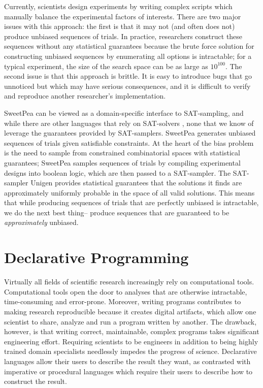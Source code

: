 Currently, scientists design experiments by writing complex scripts which manually balance the experimental factors of interests. There are two major issues with this approach: the first is that it may not (and often does not) produce unbiased sequences of trials. In practice, researchers construct these sequences without any statistical guarantees because the brute force solution for constructing unbiased sequences by enumerating all options is intractable; for a typical experiment, the size of the search space can be as large as $10^{100}$. The second issue is that this approach is brittle. It is easy to introduce bugs that go unnoticed but which may have serious consequences, and it is difficult to verify and reproduce another researcher's implementation.

SweetPea can be viewed as a domain-specific interface to SAT-sampling, and while there are other languages that rely on SAT-solvers \cite{torlak2014lightweight}, none that we know of leverage the guarantees provided by SAT-samplers. SweetPea generates unbiased sequences of trials given satisfiable constraints. At the heart of the bias problem is the need to sample from constrained combinatorial spaces with statistical guarantees; SweetPea samples sequences of trials by compiling experimental designs into boolean logic, which are then passed to a SAT-sampler. The SAT-sampler Unigen \cite{meel2016constrained}
provides statistical guarantees that the solutions it finds are approximately uniformly probable in the space of all valid solutions. This means that while producing sequences of trials that are perfectly unbiased is intractable, we do the next best thing-- produce sequences that are guaranteed to be \emph{approximately} unbiased.

\section{Declarative Programming}

Virtually all fields of scientific research increasingly rely on computational tools. Computational tools open the door to analyses that are otherwise intractable, time-consuming and error-prone. Moreover, writing programs contributes to making research reproducible because it creates digital artifacts, which allow one scientist to share, analyze and run a program written by another. The drawback, however, is that writing correct, maintainable, complex programs takes significant engineering effort. Requiring scientists to be engineers in addition to being highly trained domain specialists needlessly impedes the progress of science. Declarative languages allow their users to describe the result they want, as contrasted with imperative or procedural languages which require their users to describe how to construct the result.

